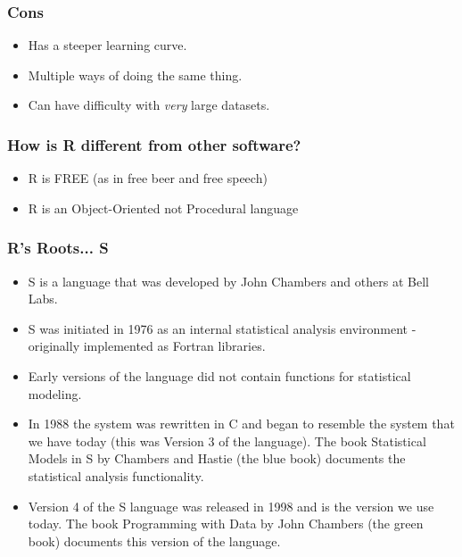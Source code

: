 \documentclass{beamer}\usepackage[]{graphicx}\usepackage[]{color}
\begin{document}
\begin{frame}
	\frametitle{Cons}
	\begin{itemize}
		\item<+-| alert@+> Has a steeper learning curve.
		\item<+-| alert@+> Multiple ways of doing the same thing.
		\item<+-| alert@+> Can have difficulty with \textit{very} large datasets.
	\end{itemize}
\end{frame}

\begin{frame}[fragile]
  \frametitle{How is R different from other software?}
  \begin{itemize}
    \item<+-| alert@+> {R is FREE (as in free beer and free speech)}
    \item<+-| alert@+> R is an Object-Oriented not Procedural language
  \end{itemize}  
\end{frame}

\begin{frame}[c]
	\frametitle{R's Roots... S}
	\begin{itemize}
	\item S is a language that was developed by John Chambers and others at Bell Labs.
	\item S was initiated in 1976 as an internal statistical analysis environment - originally implemented as Fortran libraries.
	\item Early versions of the language did not contain functions for statistical modeling.
	\item In 1988 the system was rewritten in C and began to resemble the system that we have today (this was Version 3 of the language). The book Statistical Models in S by Chambers and Hastie (the blue book) documents the statistical analysis functionality.
	\item Version 4 of the S language was released in 1998 and is the version we use today. The book Programming with Data by John Chambers (the green book) documents this version of the language.
	\end{itemize}
\end{frame}
\end{document}
